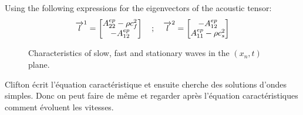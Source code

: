 Using the following expressions for the eigenvectors of the acoustic tensor:
\begin{equation*}
  {\overrightarrow{l}}^1=\left[\begin{matrix} A^{ep}_{22}- \rho c_f^2 \\ -A^{ep}_{12}\end{matrix}\right] \quad ;\quad  {\overrightarrow{l}}^2=\left[\begin{matrix} -A^{ep}_{12} \\A^{ep}_{11}-\rho c_s^2  \end{matrix}\right]
\end{equation*}
\begin{figure}[h!]
  \centering
  {}
  \caption{Characteristics of slow, fast and stationary waves in the $(x_n,t)$ plane.}
  \label{fig:ch5_charac_method}
\end{figure}







Clifton écrit l'équation caractéristique et ensuite cherche des solutions d'ondes simples. Donc on peut faire de même et regarder après l'équation caractéristiques comment évoluent les vitesses.









